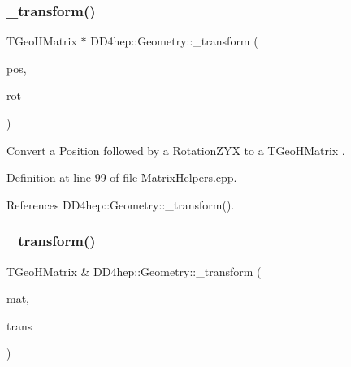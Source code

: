 \subsubsection{\texorpdfstring{\+\_\+transform()}{\_transform()}\hspace{0.1cm}{\footnotesize\ttfamily [5/11]}}
{\footnotesize\ttfamily T\+Geo\+H\+Matrix $\ast$ D\+D4hep\+::\+Geometry\+::\+\_\+transform (\begin{DoxyParamCaption}\item[{const \hyperlink{namespace_d_d4hep_1_1_geometry_a55083902099d03506c6db01b80404900}{Geometry\+::\+Position} \&}]{pos,  }\item[{const \hyperlink{namespace_d_d4hep_1_1_geometry_a24667b2b9c3cec3d5239828db4d52189}{Geometry\+::\+Rotation\+Z\+YX} \&}]{rot }\end{DoxyParamCaption})}



Convert a Position followed by a Rotation\+Z\+YX to a T\+Geo\+H\+Matrix . 



Definition at line 99 of file Matrix\+Helpers.\+cpp.



References D\+D4hep\+::\+Geometry\+::\+\_\+transform().

\hypertarget{group___d_d4_h_e_p___g_e_o_m_e_t_r_y_gae56d3e609e5195af8ba7271391b608e5}{}\label{group___d_d4_h_e_p___g_e_o_m_e_t_r_y_gae56d3e609e5195af8ba7271391b608e5} 
\subsubsection{\texorpdfstring{\+\_\+transform()}{\_transform()}\hspace{0.1cm}{\footnotesize\ttfamily [6/11]}}
{\footnotesize\ttfamily T\+Geo\+H\+Matrix \& D\+D4hep\+::\+Geometry\+::\+\_\+transform (\begin{DoxyParamCaption}\item[{T\+Geo\+H\+Matrix \&}]{mat,  }\item[{const \hyperlink{namespace_d_d4hep_1_1_geometry_aeb4c0356d12fd7be49a0aae50514e64b}{Geometry\+::\+Transform3D} \&}]{trans }\end{DoxyParamCaption})}




